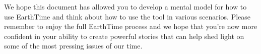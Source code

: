 \documentclass[
]{krantz}
\begin{document}
We hope this document has allowed you to develop a mental model for how to use EarthTime and think about how to use the tool in various scenarios. Please remember to enjoy the full EarthTime process and we hope that you're now more confident in your ability to create powerful stories that can help shed light on some of the most pressing issues of our time.

  

\backmatter
\printindex
\end{document}
